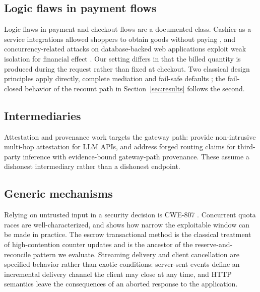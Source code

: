 \documentclass[preprint,3p,authoryear,12pt]{elsarticle}
\begin{document}
\subsection{Logic flaws in payment flows}
Logic flaws in payment and checkout flows are a documented class. Cashier-as-a-service
integrations allowed shoppers to obtain goods without paying \citep{cashier}, and
concurrency-related attacks on database-backed web applications exploit weak isolation
for financial effect \citep{acidrain}. Our setting differs in that the billed quantity is
produced during the request rather than fixed at checkout. Two classical design
principles apply directly, complete mediation and fail-safe defaults \citep{saltzer}; the
fail-closed behavior of the recount path in Section~\ref{sec:results} follows the second.

\subsection{Intermediaries}
Attestation and provenance work targets the gateway path: \citet{aex} provide
non-intrusive multi-hop attestation for LLM APIs, and \citet{gwprov} address forged
routing claims for third-party inference with evidence-bound gateway-path provenance.
These assume a dishonest intermediary rather than a dishonest endpoint.

\subsection{Generic mechanisms}
Relying on untrusted input in a security decision is CWE-807 \citep{cwe807}. Concurrent
quota races are well-characterized, and \citet{kettle} shows how narrow the exploitable
window can be made in practice. The escrow transactional method \citep{escrow} is the
classical treatment of high-contention counter updates and is the ancestor of the
reserve-and-reconcile pattern we evaluate. Streaming delivery and client cancellation are
specified behavior rather than exotic conditions: server-sent events \citep{sse} define
an incremental delivery channel the client may close at any time, and HTTP semantics
\citep{rfc9110} leave the consequences of an aborted response to the application.
\end{document}

